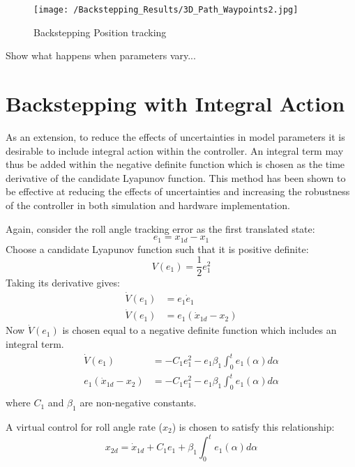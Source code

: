 \begin{figure}[htb]
\begin{center}
	\texttt{[image: /Backstepping\_Results/3D\_Path\_Waypoints2.jpg]}%
	\end{center}
	\caption{Backstepping Position tracking}%
	\label{fig:Backstep_path}%
\end{figure}


Show what happens when parameters vary...
\FloatBarrier
\section{Backstepping with Integral Action}\label{section:IntBack}
As an extension, to reduce the effects of uncertainties in model parameters it is desirable to include integral action within the controller. An integral term may thus be added within the negative definite function which is chosen as the time derivative of the candidate Lyapunov function. This method has been shown to be effective at reducing the effects of uncertainties and increasing the robustness of the controller in both simulation\cite{Jasim2015} and hardware\cite{Bouabdallah2006} implementation.

Again, consider the roll angle tracking error as the first translated state:
\[e_{1}=x_{1d}-x_{1}\]
Choose a candidate Lyapunov function such that it is positive definite:
\[V(e_{1})=\frac{1}{2}e_{1}^{2}\]
Taking its derivative gives:
\begin{equation}
\begin{split}
\dot{V}(e_{1})&=e_{1}\dot{e}_{1}\\
\dot{V}(e_{1})&=e_{1}(\dot{x}_{1d}-x_{2})
\end{split}
\end{equation}
Now $\dot{V}(e_{1})$ is chosen equal to a negative definite function which includes an integral term.
\begin{equation}
\begin{split}
\dot{V}(e_{1})&=-C_{1}e_{1}^{2}-e_{1}\beta_{1}\int^{t}_{0} e_{1}(\alpha) d\alpha\\
e_{1}(\dot{x}_{1d}-x_{2})&=-C_{1}e_{1}^{2}-e_{1}\beta_{1}\int^{t}_{0} e_{1}(\alpha) d\alpha\\
\end{split}
\end{equation}
where $C_{1}$ and $\beta_{1}$ are non-negative constants.

A virtual control for roll angle rate ($x_{2}$) is chosen to satisfy this relationship:
\[x_{2d}=\dot{x}_{1d}+C_{1}e_{1}+\beta_{1}\int^{t}_{0} e_{1}(\alpha) d\alpha\]

